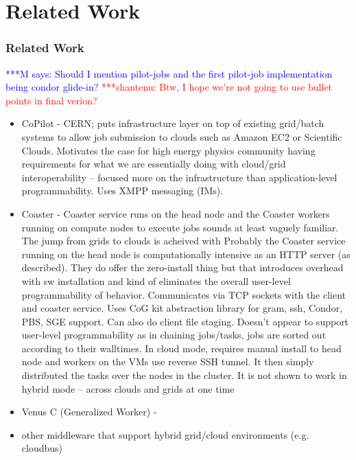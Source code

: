 \documentclass[times]{cpeauth}
\newcommand{\jhanote}[1]{ {\textcolor{red} { ***shantenu: #1 }}}
\newcommand{\mrnote}[1]{ {\textcolor{blue} { ***M says: #1 }}}
\newcommand{\note}[1]{ {\textcolor{magenta} { ***Note: #1 }}}
\newcommand{\mrnote}[1]{}
\newcommand{\jhanote}[1]{}
\newcommand{\note}[1]{}
\begin{document}
\section{Related Work}


\subsubsection*{Related Work} 


\mrnote{Should I mention pilot-jobs and the first pilot-job implementation being condor glide-in?}
\jhanote{Btw, I hope we're not going to use bullet points in final verion?}



\begin{itemize}

       \item CoPilot - CERN; puts infrastructure layer on top of existing grid/batch systems to allow job submission to clouds such as Amazon EC2 or Scientific Clouds. Motivates the case for high energy physics community having requirements for what we are essentially doing with cloud/grid interoperability -- focused more on the infrastructure than application-level programmability. Uses XMPP messaging (IMs). 
	\item Coaster - Coaster service runs on the head node and the Coaster workers running on compute nodes to execute jobs sounds at least vaguely familiar. The jump from grids to clouds is acheived with  Probably the Coaster service running on the head node is computationally intensive as an  HTTP server (as described). They do offer the zero-install thing but that introduces overhead with sw installation and kind of eliminates the overall user-level programmability of behavior. Communicates via TCP sockets with the client and coaster service. Uses CoG kit abstraction library for gram, ssh, Condor, PBS, SGE support. Can also do client file staging. Doesn't appear to support user-level programmability as in chaining jobs/tasks, jobs are sorted out according to their walltimes. In cloud mode, requires manual install to head node and workers on the VMs use reverse SSH tunnel. It then simply distributed the tasks over the nodes in the cluster. It is not shown to work in hybrid mode -- across clouds and grids at one time
	\item Venus C (Generalized Worker) - 
	\item other middleware that support hybrid grid/cloud environments (e.g. cloudbus)
\end{itemize}
\end{document}
